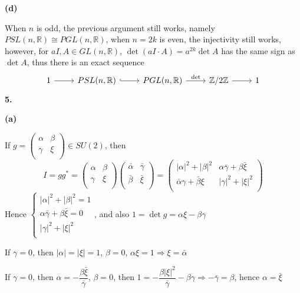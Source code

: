 \documentclass[10pt]{article}
\newcommand{\<}[1]{\langle #1 \rangle}
\begin{document}
\textbf{(d)} \par
When $n$ is odd, the previous argument still works, namely $PSL(n,\mathbb{R})\cong PGL(n,\mathbb{R})$, when $n=2k$ is even, the injectivity still works, however, for $aI,A\in GL(n,\mathbb{R})$, $\det (aI\cdot A)=a^{2k}\det A$ has the same sign as $\det A$, thus there is an exact sequence 
$$
\begin{tikzcd}
1 \arrow[r] & {PSL(n,\mathbb{R})} \arrow[r, hook] & {PGL(n,\mathbb{R})} \arrow[r, "\det"] & \mathbb{Z}/2\mathbb{Z} \arrow[r] & 1
\end{tikzcd}
$$
\textbf{5.} \par
\textbf{(a)} \par
If $g=\left( {\begin{array}{cc}
   \alpha &\beta  \\
    \gamma & \xi \\
  \end{array} } \right)\in SU(2)$, then 
  $$
  I=gg^*=\left( {\begin{array}{cc}
   \alpha &\beta  \\
    \gamma & \xi \\
  \end{array} } \right)\left( {\begin{array}{cc}
   \bar\alpha &\bar\gamma  \\
    \bar\beta & \bar\xi \\
  \end{array} } \right)=\left( {\begin{array}{cc}
   |\alpha|^2+|\beta|^2 &\alpha\bar\gamma+\beta\bar\xi  \\
    \bar\alpha\gamma+\bar\beta\xi & |\gamma|^2+|\xi|^2 \\
  \end{array} } \right)
  $$
Hence $\begin{cases}
  |\alpha|^2+|\beta|^2=1 \\
  \alpha\bar\gamma+\beta\bar\xi=0 \\
  |\gamma|^2+|\xi|^2 \\
\end{cases}$, and also $1=\det g=\alpha\xi-\beta\gamma$ \par
If $\gamma=0$, then $|\alpha|=|\xi|=1$, $\beta=0$, $\alpha\xi=1\Rightarrow \xi=\bar\alpha$ \par
If $\gamma=0$, then $\alpha=-\dfrac{\beta\bar\xi}{\bar\gamma}$, $\beta=0$, then $1=-\dfrac{\beta|\xi|^2}{\bar\gamma}-\beta\gamma\Rightarrow-\bar\gamma=\beta$, hence $\alpha=\bar\xi$ \par
\end{document}
